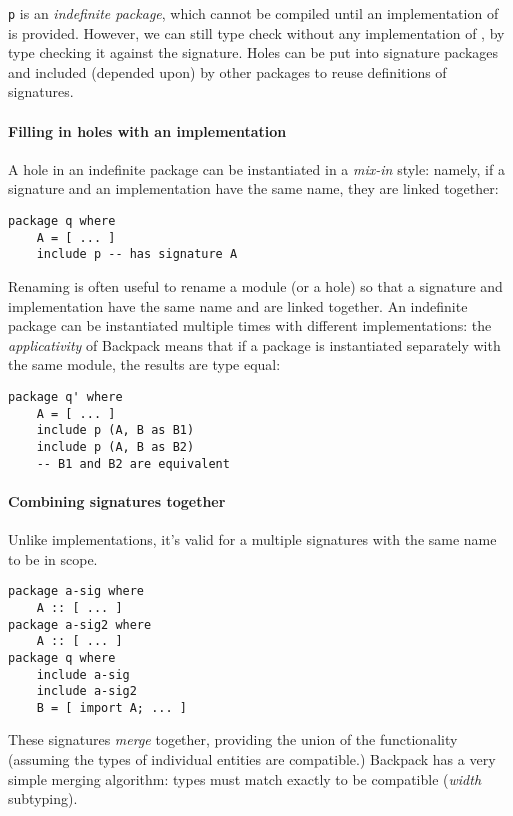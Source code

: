 \documentclass{article}
\begin{document}
\verb|p| is an \emph{indefinite package}, which cannot be compiled until
an implementation of  is provided.  However, we can still type check
 without any implementation of , by type checking it against
the signature.  Holes can be put into signature packages and included
(depended upon) by other packages to reuse definitions of signatures.

\paragraph{Filling in holes with an implementation}
A hole in an indefinite package can be instantiated in a \emph{mix-in}
style: namely, if a signature and an implementation have the same name,
they are linked together:

\begin{verbatim}
package q where
    A = [ ... ]
    include p -- has signature A
\end{verbatim}

Renaming is often useful to rename a module (or a hole) so that a signature
and implementation have the same name and are linked together.
An indefinite package can be instantiated multiple times with different
implementations: the \emph{applicativity} of Backpack means that if
a package is instantiated separately with the same module, the results
are type equal:

\begin{verbatim}
package q' where
    A = [ ... ]
    include p (A, B as B1)
    include p (A, B as B2)
    -- B1 and B2 are equivalent
\end{verbatim}

\paragraph{Combining signatures together}
Unlike implementations, it's valid for a multiple signatures with the
same name to be in scope.

\begin{verbatim}
package a-sig where
    A :: [ ... ]
package a-sig2 where
    A :: [ ... ]
package q where
    include a-sig
    include a-sig2
    B = [ import A; ... ]
\end{verbatim}

These signatures \emph{merge} together, providing the union of the
functionality (assuming the types of individual entities are
compatible.)  Backpack has a very simple merging algorithm: types must
match exactly to be compatible (\emph{width} subtyping).
\end{document}
